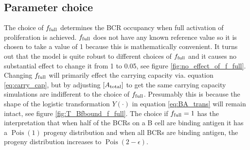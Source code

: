 \subsection{Parameter choice}
The choice of $f_{\text{full}}$ determines the BCR occupancy when full activation of proliferation is achieved.
$f_{\text{full}}$ does not have any known reference value so it is chosen to take a value of 1 because this is mathematically convenient.
It turns out that the model is quite robust to different choices of $f_{\text{full}}$ and it causes no substantial effect to change it from 1 to 0.05, see figure \ref{fig:no_effect_of_f_full}.
Changing $f_{\text{full}}$ will primarily effect the carrying capacity via. equation \ref{eq:carry_cap}, but by adjusting $[A_{\text{total}}]$ to get the same carrying capacity simulations are indifferent to the choice of $f_{\text{full}}$.
Presumably this is because the shape of the logistic transformation $Y(\cdot)$ in equation \ref{eq:BA_trans} will remain intact, see figure \ref{fig:T_Bfbound_f_full}.
The choice if $f_{\text{full}} = 1$ has the interpretation that when half of the BCRs on a B cell are binding antigen it has a $\operatorname{Pois}(1)$ progeny distribution and when all BCRs are binding antigen, the progeny distribution increases to $\operatorname{Pois}(2-\epsilon)$.
